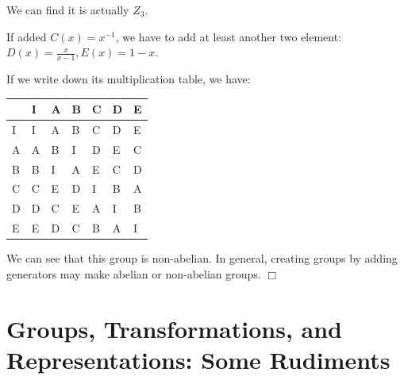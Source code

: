 \documentclass[]{ctexart}
\begin{document}
    We can find it is actually $Z_3$.
    
    If added $C(x)=x^{-1}$, we have to add at least another two element:
    $D(x)=\frac{x}{x-1},E(x)=1-x$.
    
    If we write down its multiplication table, we have:
    \begin{center}
    	\begin{tabular}{l|llllll}
    		\cline{2-7}
    		& \multicolumn{1}{l|}{I} & \multicolumn{1}{l|}{A} & \multicolumn{1}{l|}{B} & \multicolumn{1}{l|}{C} & \multicolumn{1}{l|}{D} & \multicolumn{1}{l|}{E} \\ \hline
    		\multicolumn{1}{|l|}{I} & I                      & A                      & B                      & C                      & D                      & E                      \\ \cline{1-1}
    		\multicolumn{1}{|l|}{A} & A                      & B                      & I                      & D                      & E                      & C                      \\ \cline{1-1}
    		\multicolumn{1}{|l|}{B} & B                      & I                      & A                      & E                      & C                      & D                      \\ \cline{1-1}
    		\multicolumn{1}{|l|}{C} & C                      & E                      & D                      & I                      & B                      & A                      \\ \cline{1-1}
    		\multicolumn{1}{|l|}{D} & D                      & C                      & E                      & A                      & I                      & B                      \\ \cline{1-1}
    		\multicolumn{1}{|l|}{E} & E                      & D                      & C                      & B                      & A                      & I                      \\ \cline{1-1}
    	\end{tabular}
    \end{center}\textbf{} 
    
    We can see that this group is non-abelian. In general, creating groups by adding generators may make abelian or non-abelian groups. $\Box$
    
\section{Groups, Transformations, and Representations: Some Rudiments}
\end{document}
